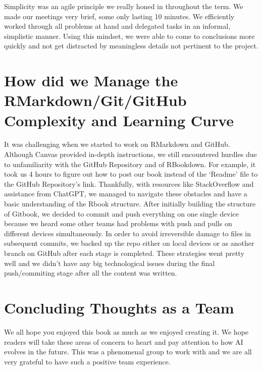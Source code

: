 \documentclass[
]{book}
\begin{document}
Simplicity was an agile principle we really honed in throughout the term. We made our meetings very brief, some only lasting 10 minutes. We efficiently worked through all problems at hand and delegated tasks in an informal, simplistic manner. Using this mindset, we were able to come to conclusions more quickly and not get distracted by meaningless details not pertinent to the project.

\hypertarget{how-did-we-manage-the-rmarkdowngitgithub-complexity-and-learning-curve}{%
\section{How did we Manage the RMarkdown/Git/GitHub Complexity and Learning Curve}\label{how-did-we-manage-the-rmarkdowngitgithub-complexity-and-learning-curve}}

It was challenging when we started to work on RMarkdown and GitHub. Although Canvas provided in-depth instructions, we still encountered hurdles due to unfamiliarity with the GitHub Repository and of RBookdown. For example, it took us 4 hours to figure out how to post our book instead of the `Readme' file to the GitHub Repository's link. Thankfully, with resources like StackOverflow and assistance from ChatGPT, we managed to navigate these obstacles and have a basic understanding of the Rbook structure.
After initially building the structure of Gitbook, we decided to commit and push everything on one single device because we heard some other teams had problems with push and pulls on different devices simultaneously. In order to avoid irreversible damage to files in subsequent commits, we backed up the repo either on local devices or as another branch on GitHub after each stage is completed. These strategies went pretty well and we didn't have any big technological issues during the final push/commiting stage after all the content was written.

\hypertarget{concluding-thoughts-as-a-team}{%
\section{Concluding Thoughts as a Team}\label{concluding-thoughts-as-a-team}}

We all hope you enjoyed this book as much as we enjoyed creating it. We hope readers will take these areas of concern to heart and pay attention to how AI evolves in the future. This was a phenomenal group to work with and we are all very grateful to have such a positive team experience.

  
\end{document}
